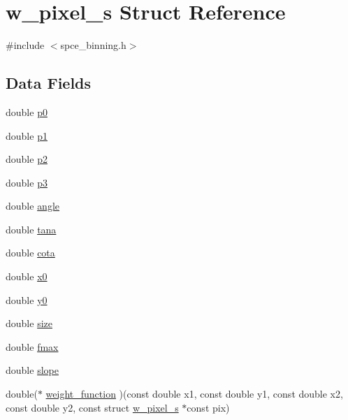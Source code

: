 \hypertarget{structw__pixel__s}{
\section{w\_\-pixel\_\-s Struct Reference}
\label{structw__pixel__s}
}


{\ttfamily \#include $<$spce\_\-binning.h$>$}\subsection*{Data Fields}
\begin{DoxyCompactItemize}
\item 
double \hyperlink{structw__pixel__s_aa573ff80cfafba3d756e11b8abeccf55}{p0}
\item 
double \hyperlink{structw__pixel__s_ac09b198d4fdd1f6575e1bd054d6dc49c}{p1}
\item 
double \hyperlink{structw__pixel__s_ad0db38112e89040778db44f2ed86031c}{p2}
\item 
double \hyperlink{structw__pixel__s_aa570917e9e9d0ab38a3ec5c1af5ec721}{p3}
\item 
double \hyperlink{structw__pixel__s_ad1a65366010f75f54f9dde10967ca11f}{angle}
\item 
double \hyperlink{structw__pixel__s_a7ec8bd3a93435d8fe1247ecf45f5a54c}{tana}
\item 
double \hyperlink{structw__pixel__s_a3de5b10d42a608e6e2139ece60448186}{cota}
\item 
double \hyperlink{structw__pixel__s_ad5f30e08ed1e83be6e28ef1681ea7dc6}{x0}
\item 
double \hyperlink{structw__pixel__s_a4e32e9f589e20889ddbe04235ceef96b}{y0}
\item 
double \hyperlink{structw__pixel__s_a8b4134dbbe9eb664a1c452fbfcf4b43a}{size}
\item 
double \hyperlink{structw__pixel__s_a6460d169eb7d6bac5c0fb4f79f4cf5b2}{fmax}
\item 
double \hyperlink{structw__pixel__s_ae586b14a26536b2fd7d4fa5fe8cb3ff2}{slope}
\item 
double($\ast$ \hyperlink{structw__pixel__s_ad04cb41431b0507e691b17c186986caa}{weight\_\-function} )(const double x1, const double y1, const double x2, const double y2, const struct \hyperlink{structw__pixel__s}{w\_\-pixel\_\-s} $\ast$const pix)
\end{DoxyCompactItemize}


